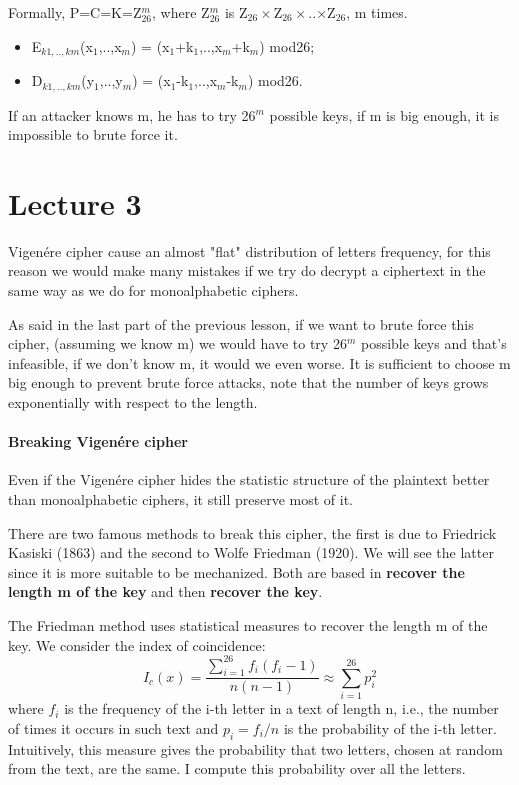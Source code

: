 \documentclass[a4paper, 12pt]{report}
\begin{document}
Formally, P=C=K=Z$^m_{26}$, where Z$^m_{26}$ is Z$_{26}\times$Z$_{26}\times$..$\times$Z$_{26}$, m times.
\begin{itemize}
	\item E$_{k1,..,km}$(x$_1$,..,x$_m$) = (x$_1$+k$_1$,..,x$_m$+k$_m$) mod26;
	\item D$_{k1,..,km}$(y$_1$,..,y$_m$) = (x$_1$-k$_1$,..,x$_m$-k$_m$) mod26.
\end{itemize}

If an attacker knows m, he has to try 26$^m$ possible keys, if m is big enough, it is impossible to brute force it.

\chapter*{Lecture 3}

Vigenére cipher cause an almost "flat" distribution of letters frequency, for this reason we would make many mistakes if we try do decrypt a ciphertext in the same way as we do for monoalphabetic ciphers.

As said in the last part of the previous lesson, if we want to brute force this cipher, (assuming we know m) we would have to try 26$^m$ possible keys and that's infeasible, if we don't know m, it would we even worse. It is sufficient to choose m big enough to prevent brute force attacks, note that the number of keys grows exponentially with respect to the length.

\subsubsection{Breaking Vigenére cipher}
Even if the Vigenére cipher hides the statistic structure of the plaintext better than monoalphabetic ciphers, it still preserve most of it.

There are two famous methods to break this cipher, the first is due to Friedrick Kasiski (1863) and the second to Wolfe Friedman (1920). We will see the latter since it is more suitable to be mechanized. Both are based in \textbf{recover the length m of the key} and then \textbf{recover the key}.

The Friedman method uses statistical measures to recover the length m of the key. We consider the index of coincidence:
\setcounter{equation}{0}
\begin{equation}
	I_c(x)=\frac{\sum_{i=1}^{26} f_i(f_i-1)}{n(n-1)} \approx \sum_{i=1}^{26}p_i^2
\end{equation}
where $f_i$ is the frequency of the i-th letter in a text of length n, i.e., the number of times it occurs in such text and $p_i = f_i/n$ is the probability of the i-th letter. Intuitively, this measure gives the probability that two letters, chosen at random from the text, are the same. I compute this probability over all the letters.
\end{document}
